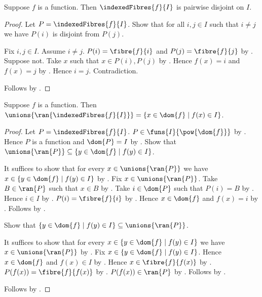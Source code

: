 \begin{proposition}\label{indexed_fibres_pairwise_disjoint}
    Suppose $f$ is a function.
    Then $\indexedFibres{f}{I}$ is pairwise disjoint on $I$.
\end{proposition}
\begin{proof}
    Let $P=\indexedFibres{f}{I}$.
    Show that for all $i,j\in I$ such that $i\neq j$
        we have $P(i)$ is disjoint from $P(j)$.
    \begin{subproof}
        Fix $i,j\in I$.
        Assume $i\neq j$.
        $P(i)=\fibre{f}{i}$ and $P(j)=\fibre{f}{j}$
            by .
        Suppose not.
        Take $x$ such that $x\in P(i),P(j)$ by .
        Hence $f(x)=i$ and $f(x)=j$ by .
        Hence $i=j$.
        Contradiction.
    \end{subproof}
    Follows by .
\end{proof}

\begin{proposition}\label{indexed_fibres_cover_values_in}
    Suppose $f$ is a function.
    Then $\unions{\ran{\indexedFibres{f}{I}}}
        =\{x\in\dom{f}\mid f(x)\in I\}$.
\end{proposition}
\begin{proof}
    Let $P=\indexedFibres{f}{I}$.
    $P\in\funs{I}{\pow{\dom{f}}}$ by .
    Hence $P$ is a function and $\dom{P}=I$
        by .
    Show that $\unions{\ran{P}}
        \subseteq\{y\in\dom{f}\mid f(y)\in I\}$.
    \begin{subproof}
        It suffices to show that for every $x\in\unions{\ran{P}}$
            we have $x\in\{y\in\dom{f}\mid f(y)\in I\}$
            by .
        Fix $x\in\unions{\ran{P}}$.
        Take $B\in\ran{P}$ such that $x\in B$ by .
        Take $i\in\dom{P}$ such that $P(i)=B$ by .
        Hence $i\in I$ by .
        $P(i)=\fibre{f}{i}$ by .
        Hence $x\in\dom{f}$ and $f(x)=i$
            by .
        Follows by \auto.
    \end{subproof}
    Show that $\{y\in\dom{f}\mid f(y)\in I\}
        \subseteq\unions{\ran{P}}$.
    \begin{subproof}
        It suffices to show that for every
            $x\in\{y\in\dom{f}\mid f(y)\in I\}$
            we have $x\in\unions{\ran{P}}$ by .
        Fix $x\in\{y\in\dom{f}\mid f(y)\in I\}$.
        Hence $x\in\dom{f}$ and $f(x)\in I$ by \auto.
        Hence $x\in\fibre{f}{f(x)}$ by .
        $P(f(x))=\fibre{f}{f(x)}$ by .
        $P(f(x))\in\ran{P}$ by .
        Follows by .
    \end{subproof}
    Follows by .
\end{proof}

